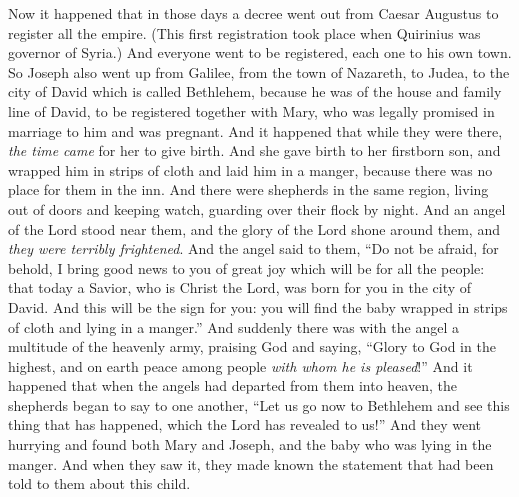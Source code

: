 \begin{biblechapter} %
 Now it happened that in those days a decree went out from Caesar Augustus to register all the empire.
\verse (This first registration took place when Quirinius was governor of Syria.)
\verse And everyone went to be registered, each one to his own town.
\verse So Joseph also went up from Galilee, from the town of Nazareth, to Judea, to the city of David which is called Bethlehem, because he was of the house and family line of David,
\verse to be registered together with Mary, who was legally promised in marriage to him and was pregnant.
\verse And it happened that while they were there, \textit{the time came} for her to give birth.
\verse And she gave birth to her firstborn son, and wrapped him in strips of cloth and laid him in a manger, because there was no place for them in the inn.
 And there were shepherds in the same region, living out of doors and keeping watch, guarding over their flock by night.
\verse And an angel of the Lord stood near them, and the glory of the Lord shone around them, and \textit{they were terribly frightened}.
\verse And the angel said to them, “Do not be afraid, for behold, I bring good news to you of great joy which will be for all the people:
\verse that today a Savior, who is Christ the Lord, was born for you in the city of David.
\verse And this will be the sign for you: you will find the baby wrapped in strips of cloth and lying in a manger.”
\verse And suddenly there was with the angel a multitude of the heavenly army, praising God and saying,
\verse “Glory to God in the highest, 
and on earth peace 
among people \textit{with whom he is pleased}!”
\verse And it happened that when the angels had departed from them into heaven, the shepherds began to say to one another, “Let us go now to Bethlehem and see this thing that has happened, which the Lord has revealed to us!”
\verse And they went hurrying and found both Mary and Joseph, and the baby who was lying in the manger.
\verse And when they saw it, they made known the statement that had been told to them about this child.

\end{biblechapter}
